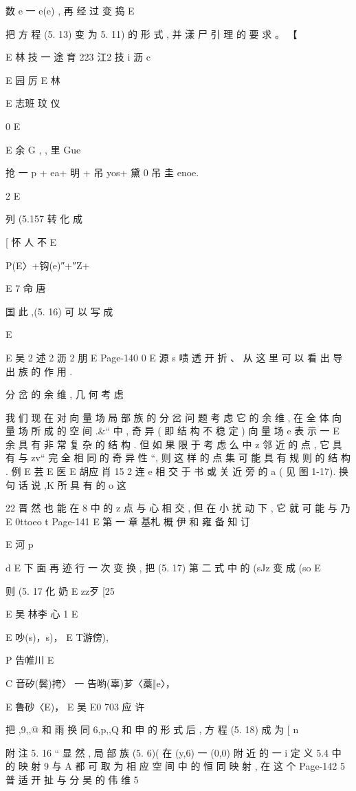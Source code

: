 {{{{{{{数 e 一 e(e) , 再 经 过 变 捣
E

把 方 程 (5. 13) 变 为 5. 11) 的 形 式 , 并 漾 尸 引 理 的 要 求 。 【

E 林 技 一 途 育 223 江2 技
i 沥 c

E 园 厉
E 林

E 志班 玟 仪

0
E

E
余 G , , 里 Gue
{抢 一 p + ea+ 明 + 吊 yos+ 黛 0 吊 圭 enoe.

2
E

列 (5.157 转 化 成

[ 怀 人 不
E {P(E〉+钩(e)″+″Z+

E
7 命 唐

国 此 ,(5. 16) 可 以 写 成

E

E 吴 2 述 2 沥 2 朋
E
Page-140
0 E 源 s
啧 透 开 折 、 从 这 里 可 以 看 出 导 出 族 的 作 用 .

分 岔 的 余 维 , 几 何 考 虑

我 们 现 在 对 向 量 场 局 部 族 的 分 岔 问 题 考 虑 它 的 余 维 , 在 全 体
向 量 场 所 成 的 空 间 .&“ 中 , 奇 异 ( 即 结 构 不 稳 定 ) 向 量 场 e 表 示 一
E 余
具 有 非 常 复 杂 的 结 构 . 但 如 果 限 于 考 虑 么 中 z 邻 近 的 点 , 它 具 有 与
zv“ 完 全 相 同 的 奇 异 性 “, 则 这 样 的 点 集 可 能 具 有 规 则 的 结 构 . 例
E 芸
E 医
E 胡应 肖 15
2 连 e
相 交 于 书 或 关 近 旁 的 a ( 见 图 1-17). 换 句 话 说 ,K 所 具 有 的 o 这

22
晋 然 也 能 在 8 中 的 z 点 与 心 相 交 , 但 在 小 扰 动 下 , 它 就 可 能 与 乃
E
0ttoeo t
Page-141
E 第 一 章 基札 概 伊 和 雍 备 知 订

E 河 p

d
E
下 面 再 迹 行 一 次 变 换 , 把 (5. 17) 第 二 式 中 的 (sJz 变 成 (so
E

则 (5. 17 化 奶
E zz歹 [25

E 吴 林李 心
1
E

E 吵(s)，s)，
E T游傍),

P 告帷川 E

C 音矽(鬓)挎〉 一 告哟(辜)芗〈藁‖e〉，

E 鲁砂〈E)， E 吴
E0 703
应 许

把 ,9,,@ 和 雨 换 同 6,p,,Q 和 申 的 形 式 后 , 方 程 (5. 18) 成 为
[ n

附 注 5. 16 “ 显 然 , 局 部 族 (5. 6)( 在 (y,6) 一 (0,0) 附 近 的 一
i
定 义 5.4 中 的 映 射 9 与 A 都 可 取 为 相 应 空 间 中 的 恒 同 映 射 , 在 这 个
Page-142
5 普 适 开 扯 与 分 吴 的 伟 维 5

}}}}}}}}}
